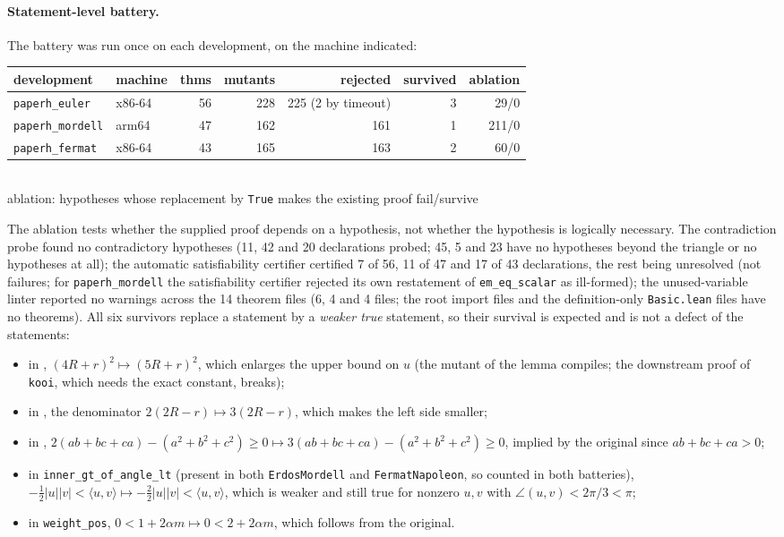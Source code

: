 \documentclass[11pt]{article}
\theoremstyle{definition}
\theoremstyle{remark}
\newcommand{\lean}[1]{\texttt{#1}}
\begin{document}
\paragraph{Statement-level battery.} The battery was run once on each development, on the machine
indicated:
\begin{center}\small
\begin{tabular}{@{}l l r r r r r@{}}
\toprule
development & machine & thms & mutants & rejected & survived & ablation\\
\midrule
\lean{paperh\_euler} & x86-64 & 56 & 228 & 225 (2 by timeout) & 3 & 29/0\\
\lean{paperh\_mordell} & arm64 & 47 & 162 & 161 & 1 & 211/0\\
\lean{paperh\_fermat} & x86-64 & 43 & 165 & 163 & 2 & 60/0\\
\bottomrule
\end{tabular}\\[2pt]
{\footnotesize ablation: hypotheses whose replacement by \lean{True} makes the existing proof fail/survive}
\end{center}
The ablation tests whether the supplied proof depends on a hypothesis, not whether the hypothesis is
logically necessary. The contradiction probe found no contradictory hypotheses (11, 42 and 20 declarations probed; 45, 5
and 23 have no hypotheses beyond the triangle or no hypotheses at all); the automatic satisfiability
certifier certified 7 of 56, 11 of 47 and 17 of 43 declarations, the rest being unresolved (not failures;
for \lean{paperh\_mordell} the satisfiability certifier rejected its own restatement of
\lean{em\_eq\_scalar} as ill-formed); the
unused-variable linter reported no warnings across the 14 theorem files (6, 4 and 4 files; the root import files and the definition-only \lean{Basic.lean} files have no theorems). All six survivors replace a statement by a
\emph{weaker true} statement, so their survival is expected and is not a defect of the statements:
\begin{itemize}
\item in , $(4R+r)^2\mapsto(5R+r)^2$, which enlarges the upper bound
on $u$ (the mutant of the lemma compiles; the downstream proof of \lean{kooi}, which needs the exact
constant, breaks);
\item in , the denominator $2(2R-r)\mapsto3(2R-r)$, which makes the
left side smaller;
\item in , $2(ab+bc+ca)-(a^2+b^2+c^2)\ge0\mapsto
3(ab+bc+ca)-(a^2+b^2+c^2)\ge0$, implied by the original since $ab+bc+ca>0$;
\item in \lean{inner\_gt\_of\_angle\_lt} (present in both \lean{ErdosMordell} and
\lean{FermatNapoleon}, so counted in both batteries), $-\tfrac12|u||v|<\langle u,v\rangle\mapsto
-\tfrac22|u||v|<\langle u,v\rangle$, which is weaker and still true for nonzero $u,v$ with
$\angle(u,v)<2\pi/3<\pi$;
\item in \lean{weight\_pos}, $0<1+2\alpha m\mapsto0<2+2\alpha m$, which follows from the original.
\end{itemize}
\end{document}
